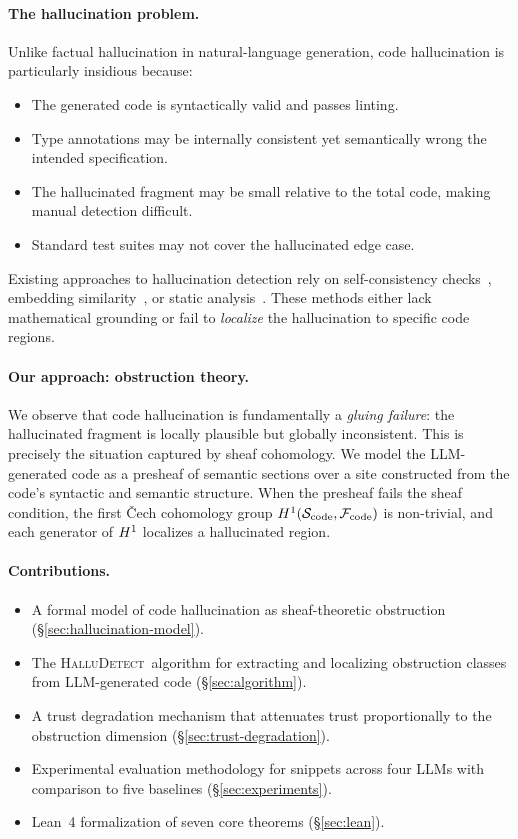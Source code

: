 \documentclass[11pt]{article}
\newcommand{\HalluDetect}{\textsc{HalluDetect}}
\newcommand{\CodeSheaf}{\mathcal{F}_{\mathrm{code}}}
\newcommand{\CodeSite}{\Site_{\mathrm{code}}}
\begin{document}
\paragraph{The hallucination problem.}
Unlike factual hallucination in natural-language generation, code
hallucination is particularly insidious because:
\begin{itemize}[noitemsep]
  \item The generated code is syntactically valid and passes linting.
  \item Type annotations may be internally consistent yet semantically
        wrong \wrt the intended specification.
  \item The hallucinated fragment may be small relative to the total
        code, making manual detection difficult.
  \item Standard test suites may not cover the hallucinated edge case.
\end{itemize}
Existing approaches to hallucination detection rely on self-consistency
checks~\cite{Manakul2023}, embedding similarity~\cite{Varshney2023},
or static analysis~\cite{Pylint,Mypy}.  These methods either lack
mathematical grounding or fail to \emph{localize} the hallucination
to specific code regions.

\paragraph{Our approach: obstruction theory.}
We observe that code hallucination is fundamentally a \emph{gluing
failure}: the hallucinated fragment is locally plausible but globally
inconsistent.  This is precisely the situation captured by sheaf
cohomology.  We model the LLM-generated code as a presheaf of
semantic sections over a site constructed from the code's syntactic
and semantic structure.  When the presheaf fails the sheaf condition,
the first \v{C}ech cohomology group $\Hcoh{1}(\CodeSite, \CodeSheaf)$
is non-trivial, and each generator of $H^{1}$ localizes a
hallucinated region.

\paragraph{Contributions.}
\begin{itemize}[noitemsep]
  \item A formal model of code hallucination as sheaf-theoretic
        obstruction (§\ref{sec:hallucination-model}).
  \item The \HalluDetect\ algorithm for extracting and localizing
        obstruction classes from LLM-generated code
        (§\ref{sec:algorithm}).
  \item A trust degradation mechanism that attenuates trust
        proportionally to the obstruction dimension
        (§\ref{sec:trust-degradation}).
  \item Experimental evaluation methodology for snippets
        across four LLMs with comparison to five baselines
        (§\ref{sec:experiments}).
  \item Lean~4 formalization of seven core theorems
        (§\ref{sec:lean}).
\end{itemize}
\end{document}
